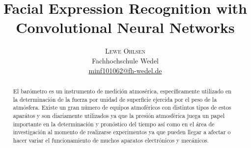 \documentclass[twoside]{article}
\title{\vspace{-15mm}\fontsize{16pt}{10pt}\selectfont\textbf{Facial Expression Recognition with\\ Convolutional Neural Networks}} %
\author{
	\large
	\textsc{Lewe Ohlsen}\\[2mm] %
	\normalsize Fachhochschule Wedel \\ %
	\normalsize \href{mailto:minf101062@fh-wedel.de}{minf101062@fh-wedel.de} %
	\vspace{-5mm}
}
\date{}
\begin{document}
\maketitle %


\begin{abstract}

\noindent El barómetro es un instrumento de medición atmosérica, específicamente utilizado en la determinación de la fuerza por unidad de superficie ejercida por el peso de la atmósfera. Existe un gran número de equipos atmoféricos con distintos tipos de estos aparátos y son diariamente utilizados ya que la presión atmosférica juega un papel importante en la determinación y pronóstico del tiempo así como en el área de investigación al momento de realizarse experimentos ya que pueden llegar a afectar o hacer variar el funcionamiento de muchos aparatos electrónicos y mecánicos.

\end{abstract}

\end{document}
